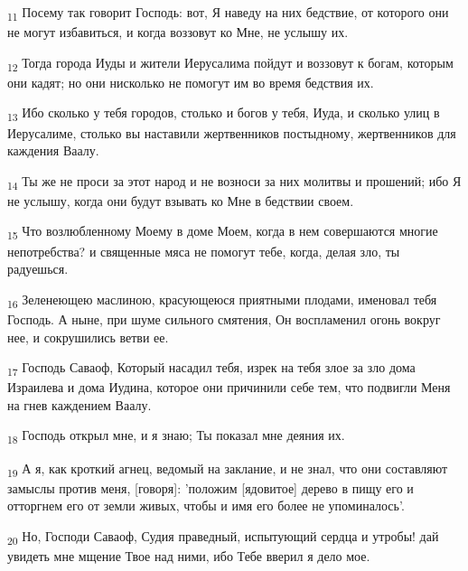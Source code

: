 \begin{tcolorbox}
\textsubscript{11} Посему так говорит Господь: вот, Я наведу на них бедствие, от которого они не могут избавиться, и когда воззовут ко Мне, не услышу их.
\end{tcolorbox}
\begin{tcolorbox}
\textsubscript{12} Тогда города Иуды и жители Иерусалима пойдут и воззовут к богам, которым они кадят; но они нисколько не помогут им во время бедствия их.
\end{tcolorbox}
\begin{tcolorbox}
\textsubscript{13} Ибо сколько у тебя городов, столько и богов у тебя, Иуда, и сколько улиц в Иерусалиме, столько вы наставили жертвенников постыдному, жертвенников для каждения Ваалу.
\end{tcolorbox}
\begin{tcolorbox}
\textsubscript{14} Ты же не проси за этот народ и не возноси за них молитвы и прошений; ибо Я не услышу, когда они будут взывать ко Мне в бедствии своем.
\end{tcolorbox}
\begin{tcolorbox}
\textsubscript{15} Что возлюбленному Моему в доме Моем, когда в нем совершаются многие непотребства? и священные мяса не помогут тебе, когда, делая зло, ты радуешься.
\end{tcolorbox}
\begin{tcolorbox}
\textsubscript{16} Зеленеющею маслиною, красующеюся приятными плодами, именовал тебя Господь. А ныне, при шуме сильного смятения, Он воспламенил огонь вокруг нее, и сокрушились ветви ее.
\end{tcolorbox}
\begin{tcolorbox}
\textsubscript{17} Господь Саваоф, Который насадил тебя, изрек на тебя злое за зло дома Израилева и дома Иудина, которое они причинили себе тем, что подвигли Меня на гнев каждением Ваалу.
\end{tcolorbox}
\begin{tcolorbox}
\textsubscript{18} Господь открыл мне, и я знаю; Ты показал мне деяния их.
\end{tcolorbox}
\begin{tcolorbox}
\textsubscript{19} А я, как кроткий агнец, ведомый на заклание, и не знал, что они составляют замыслы против меня, [говоря]: 'положим [ядовитое] дерево в пищу его и отторгнем его от земли живых, чтобы и имя его более не упоминалось'.
\end{tcolorbox}
\begin{tcolorbox}
\textsubscript{20} Но, Господи Саваоф, Судия праведный, испытующий сердца и утробы! дай увидеть мне мщение Твое над ними, ибо Тебе вверил я дело мое.
\end{tcolorbox}
